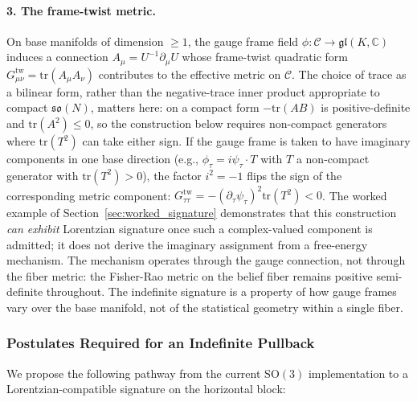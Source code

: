 \documentclass[11pt]{article}
\begin{document}
\paragraph{3. The frame-twist metric.} On base manifolds of dimension $\geq 1$, the gauge frame field $\phi: \mathcal{C} \to \mathfrak{gl}(K, \mathbb{C})$ induces a connection $A_\mu = U^{-1}\partial_\mu U$ whose frame-twist quadratic form $G_{\mu\nu}^{\mathrm{tw}} = \mathrm{tr}(A_\mu A_\nu)$ contributes to the effective metric on $\mathcal{C}$. The choice of trace as a bilinear form, rather than the negative-trace inner product appropriate to compact $\mathfrak{so}(N)$, matters here: on a compact form $-\mathrm{tr}(AB)$ is positive-definite and $\mathrm{tr}(A^2) \le 0$, so the construction below requires non-compact generators where $\mathrm{tr}(T^2)$ can take either sign. If the gauge frame is taken to have imaginary components in one base direction (e.g., $\phi_\tau = i\psi_\tau \cdot T$ with $T$ a non-compact generator with $\mathrm{tr}(T^2) > 0$), the factor $i^2 = -1$ flips the sign of the corresponding metric component: $G_{\tau\tau}^{\mathrm{tw}} = -(\partial_\tau \psi_\tau)^2 \mathrm{tr}(T^2) < 0$. The worked example of Section~\ref{sec:worked_signature} demonstrates that this construction \emph{can exhibit} Lorentzian signature once such a complex-valued component is admitted; it does not derive the imaginary assignment from a free-energy mechanism. The mechanism operates through the gauge connection, not through the fiber metric: the Fisher-Rao metric on the belief fiber remains positive semi-definite throughout. The indefinite signature is a property of how gauge frames vary over the base manifold, not of the statistical geometry within a single fiber.

\subsubsection{Postulates Required for an Indefinite Pullback}

We propose the following pathway from the current $\mathrm{SO}(3)$ implementation to a Lorentzian-compatible signature on the horizontal block:
\end{document}
